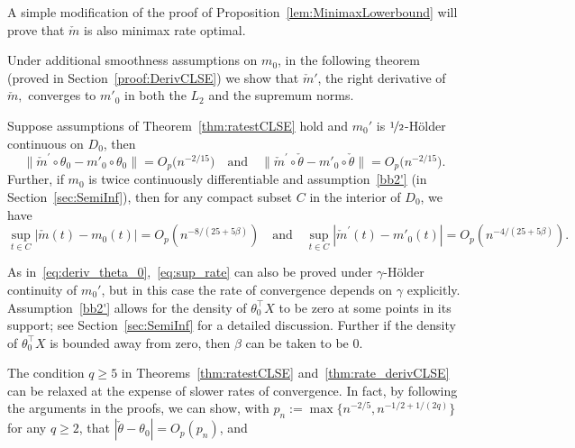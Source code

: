 A simple modification of the proof of Proposition~\ref{lem:MinimaxLowerbound} will prove that $\check{m}$ is also minimax rate optimal. {Under additional smoothness assumptions on $m_0$, in the following theorem (proved in Section~\ref{proof:DerivCLSE}) we show that $\check{m}'$,  the right derivative of $\check{m},$ converges to $m'_0$ in both the $L_2$  and the supremum norms.


\begin{thm}\label{thm:rate_derivCLSE} Suppose assumptions  of Theorem~\ref{thm:ratestCLSE} hold and $m_0'$ is $\nicefrac{1}{2}$-H\"{o}lder continuous on $D_0$, then 
\begin{equation} \label{eq:deriv_theta_0}
{\|\check{m}^\prime \circ \theta_0- m'_0\circ\theta_0\| = O_p\big(n^{-2/15}\big)}\quad \text{and} \quad  \|\check{m}^\prime \circ \check\theta- m'_0\circ\check\theta\|= O_p\big(n^{-2/15}\big).
\end{equation}
Further, if $m_0$ is twice continuously differentiable and assumption~\ref{bb2'} (in Section~\ref{sec:SemiInf}), then for any compact subset $C$ in the interior of $D_0$, we have %
\begin{equation}\label{eq:sup_rate}
\sup_{t\in C} |\check{m} (t)- m_0 (t)| = O_p(n^{-8/(25 + 5\beta)})%
 \quad \text{and} \quad \sup_{t\in C} |\check{m}^\prime (t)- m'_0 (t)| = O_p(n^{-4/(25 + 5\beta)}).%
\end{equation}
\end{thm}
\begin{remark}\label{rem:TwiceCont}
As in~\eqref{eq:deriv_theta_0},~\eqref{eq:sup_rate} can also be proved under $\gamma$-H\"{o}lder continuity of $m_0'$, but in this case the rate of convergence depends on $\gamma$ explicitly. Assumption~\ref{bb2'} allows for the density of $\theta_0^{\top}X$ to be zero at some points in its support; see Section~\ref{sec:SemiInf} for a detailed discussion. Further if the density of $\theta_0^{\top}X$ is bounded away from zero, then $\beta$ can be taken to be $0$. 
\end{remark}
\begin{remark}\label{rem:lowerQ}
The condition $q\ge5$ in Theorems~\ref{thm:ratestCLSE} and~\ref{thm:rate_derivCLSE} can be relaxed at the expense of slower rates of convergence. { In fact, by following the arguments in the proofs, we can show, with $p_n := \max\{n^{-2/5}, n^{-1/2 + 1/(2q)}\}$ for any $q\ge2$, that $|\check{\theta} - \theta_0| = O_p(p_n)$, and 
}
\end{remark}}
